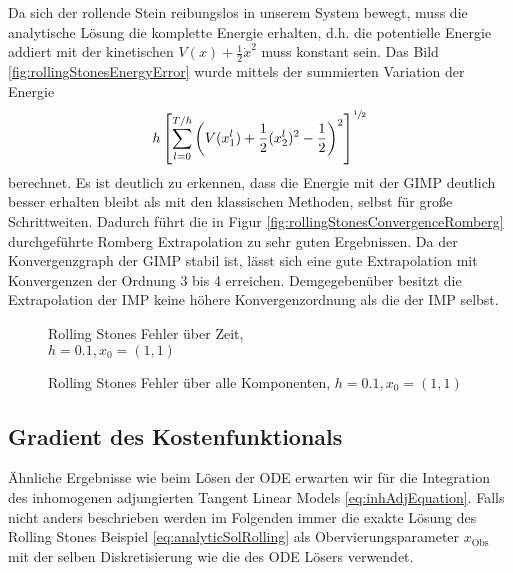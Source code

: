 Da sich der rollende Stein reibungslos in unserem System bewegt, muss die analytische Lösung die komplette Energie erhalten, d.h. die potentielle Energie addiert mit der kinetischen $V(x) + \frac{1}{2}\dot x^2$ muss konstant sein. Das Bild \ref{fig:rollingStonesEnergyError} wurde mittels der summierten Variation der Energie 
\[
 h \left[\sum_{l=0}^{T/h} \left( V(x_1^l) + \frac{1}{2} (x_2^l)^2 -\frac{1}{2}\right)^2\right]^{\sfrac{1}{2}}
\]
berechnet. Es ist deutlich zu erkennen, dass die Energie mit der GIMP deutlich besser erhalten bleibt als mit den klassischen Methoden, selbst für große Schrittweiten.
Dadurch führt die in Figur \ref{fig:rollingStonesConvergenceRomberg} durchgeführte Romberg Extrapolation zu sehr guten Ergebnissen. Da der Konvergenzgraph der GIMP stabil ist, lässt sich eine gute Extrapolation mit Konvergenzen der Ordnung 3 bis 4 erreichen. Demgegebenüber besitzt die Extrapolation der IMP keine höhere Konvergenzordnung als die der IMP selbst.
\begin{figure}[H]
\footnotesize 
\centering
\begin{minipage}[b]{0.49\linewidth}

\caption{Rolling Stones Fehler über Zeit, \\$h=0.1,x_0=(1,1)$}
\label{fig:rollingStonesEOT}
\end{minipage}
\begin{minipage}[b]{0.49\linewidth}

\caption{Rolling Stones Fehler über alle Komponenten, $h=0.1,x_0=(1,1)$}
\label{fig:rollingStonesEOTAll}
\end{minipage}
\end{figure}

\subsection{Gradient des Kostenfunktionals}
Ähnliche Ergebnisse wie beim Lösen der ODE erwarten wir für die Integration des inhomogenen adjungierten Tangent Linear Models \eqref{eq:inhAdjEquation}. Falls nicht anders beschrieben werden im Folgenden immer die exakte Lösung des Rolling Stones Beispiel \eqref{eq:analyticSolRolling} als Obervierungsparameter $x_{\text{Obs}}$ mit der selben Diskretisierung wie die des ODE Lösers verwendet.

